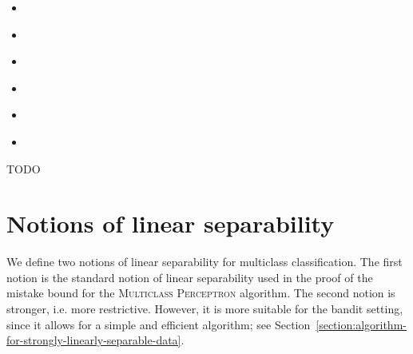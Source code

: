 \documentclass[12pt]{article}
\begin{document}



\begin{itemize}
\item \cite{Abernethy-Rakhlin-2009}

\item \cite{Chen-Chen-Zhang-Chen-Zhang-2009}

\item \cite{Hazan-Kale-2011}

\item \cite{Beygelzimer-Orabona-Zhang-2017}

\item \cite{Foster-Kale-Luo-Mohri-Sridharan-2018}

\item \cite{Foster-Krishnamurthy-2018}
\end{itemize}


TODO


\section{Notions of linear separability}
\label{section:notions-of-linear-separability}

We define two notions of linear separability for multiclass classification. The
first notion is the standard notion of linear separability used in the proof of
the mistake bound for the \textsc{Multiclass Perceptron} algorithm. The second
notion is stronger, i.e. more restrictive. However, it is more suitable for the
bandit setting, since it allows for a simple and efficient algorithm; see
Section~\ref{section:algorithm-for-strongly-linearly-separable-data}.
\end{document}
